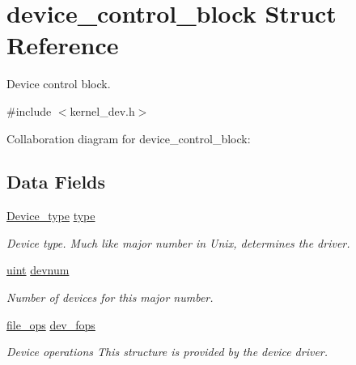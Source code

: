 \hypertarget{structdevice__control__block}{}\section{device\+\_\+control\+\_\+block Struct Reference}
\label{structdevice__control__block}


Device control block.  




{\ttfamily \#include $<$kernel\+\_\+dev.\+h$>$}



Collaboration diagram for device\+\_\+control\+\_\+block\+:
\subsection*{Data Fields}
\begin{DoxyCompactItemize}
\item 
\hyperlink{group__dev_ga879ceac20e83b2375e5b49f4379b0c90}{Device\+\_\+type} \hyperlink{structdevice__control__block_a35a45268132777177a33513c747633c4}{type}\hypertarget{structdevice__control__block_a35a45268132777177a33513c747633c4}{}\label{structdevice__control__block_a35a45268132777177a33513c747633c4}

\begin{DoxyCompactList}\small\item\em Device type. Much like \textquotesingle{}major number\textquotesingle{} in Unix, determines the driver. \end{DoxyCompactList}\item 
\hyperlink{bios_8h_a91ad9478d81a7aaf2593e8d9c3d06a14}{uint} \hyperlink{structdevice__control__block_a25d8f038a1c6d41f445d078276117fba}{devnum}\hypertarget{structdevice__control__block_a25d8f038a1c6d41f445d078276117fba}{}\label{structdevice__control__block_a25d8f038a1c6d41f445d078276117fba}

\begin{DoxyCompactList}\small\item\em Number of devices for this major number. \end{DoxyCompactList}\item 
\hyperlink{group__dev_gaab625d8ae3a95e942ed10ed1579f5042}{file\+\_\+ops} \hyperlink{structdevice__control__block_a2945d5da96f40ff7fae94e295624a7c7}{dev\+\_\+fops}\hypertarget{structdevice__control__block_a2945d5da96f40ff7fae94e295624a7c7}{}\label{structdevice__control__block_a2945d5da96f40ff7fae94e295624a7c7}

\begin{DoxyCompactList}\small\item\em Device operations This structure is provided by the device driver. \end{DoxyCompactList}\end{DoxyCompactItemize}


